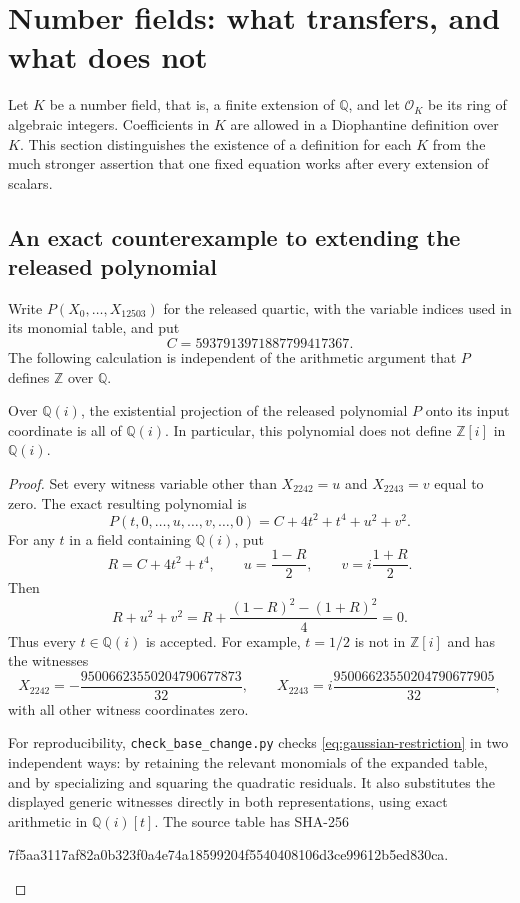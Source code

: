 
\section{Number fields: what transfers, and what does not}
\label{sec:number-fields}

Let $K$ be a number field, that is, a finite extension of $\mathbb Q$, and let
$\mathcal O_K$ be its ring of algebraic integers.  Coefficients in $K$ are
allowed in a Diophantine definition over $K$.  This section distinguishes
the existence of a definition for each $K$ from the much stronger assertion
that one fixed equation works after every extension of scalars.

\subsection{An exact counterexample to extending the released polynomial}

Write $P(X_0,\ldots,X_{12503})$ for the released quartic, with the variable
indices used in its monomial table, and put
\[
 C=5937913971887799417367.
\]
The following calculation is independent of the arithmetic argument that
$P$ defines $\mathbb Z$ over $\mathbb Q$.

\begin{proposition}\label{prop:quartic-gaussian}
Over $\mathbb Q(i)$, the existential projection of the released polynomial
$P$ onto its input coordinate is all of $\mathbb Q(i)$.  In particular,
this polynomial does not define $\mathbb Z[i]$ in $\mathbb Q(i)$.
\end{proposition}
\begin{proof}
Set every witness variable other than $X_{2242}=u$ and $X_{2243}=v$ equal
to zero.  The exact resulting polynomial is
\begin{equation}\label{eq:gaussian-restriction}
 P(t,0,\ldots,u,\ldots,v,\ldots,0)=C+4t^2+t^4+u^2+v^2.
\end{equation}
For any $t$ in a field containing $\mathbb Q(i)$, put
\[
 R=C+4t^2+t^4,\qquad u=\frac{1-R}{2},\qquad
 v=i\frac{1+R}{2}.
\]
Then
\[
 R+u^2+v^2
 =R+\frac{(1-R)^2-(1+R)^2}{4}=0.
\]
Thus every $t\in\mathbb Q(i)$ is accepted.  For example, $t=1/2$ is not
in $\mathbb Z[i]$ and has the witnesses
\[
 X_{2242}=-\frac{95006623550204790677873}{32},\qquad
 X_{2243}=i\frac{95006623550204790677905}{32},
\]
with all other witness coordinates zero.

For reproducibility, \texttt{check\_base\_change.py} checks
\eqref{eq:gaussian-restriction} in two independent ways: by retaining the
relevant monomials of the expanded table, and by specializing and squaring
the quadratic residuals.  It also substitutes the displayed generic
witnesses directly in both representations, using exact arithmetic in
$\mathbb Q(i)[t]$.  The source table has SHA-256
\begin{center}\small\ttfamily
7f5aa3117af82a0b323f0a4e74a18599204f5540408106d3ce99612b5ed830ca.
\end{center}
\end{proof}


